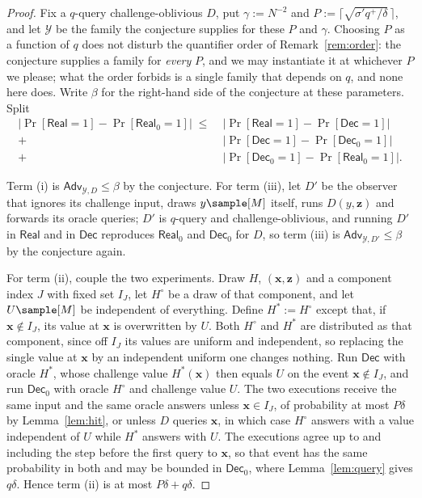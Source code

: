 \documentclass{conjura-conjecture}
\newcommand{\Adv}{\mathsf{Adv}}
\newcommand{\Real}{\mathsf{Real}}
\newcommand{\Dec}{\mathsf{Dec}}
\newcommand{\Prob}[1]{\Pr\!\left[#1\right]}
\newcommand{\vx}{\mathbf{x}}
\newcommand{\vz}{\mathbf{z}}
\begin{document}
\begin{proof}
Fix a $q$-query challenge-oblivious $D$, put $\gamma := N^{-2}$ and
$P := \lceil \sqrt{\sigma' q^{+}/\delta}\, \rceil$, and let $\mathcal{Y}$ be
the family the conjecture supplies for these $P$ and $\gamma$. Choosing $P$
as a function of $q$ does not disturb the quantifier order of
Remark~\ref{rem:order}: the conjecture supplies a family for \emph{every}
$P$, and we may instantiate it at whichever $P$ we please; what the order
forbids is a single family that depends on $q$, and none here does. Write
$\beta$ for the right-hand side of the conjecture at these parameters.
Split
\begin{align*}
  \bigl|\Prob{\Real = 1} - \Prob{\Real_0 = 1}\bigr|
  \;\le\;&
  \bigl|\Prob{\Real = 1} - \Prob{\Dec = 1}\bigr| \tag{i}\\
  +\;& \bigl|\Prob{\Dec = 1} - \Prob{\Dec_0 = 1}\bigr| \tag{ii}\\
  +\;& \bigl|\Prob{\Dec_0 = 1} - \Prob{\Real_0 = 1}\bigr| . \tag{iii}
\end{align*}

Term (i) is $\Adv_{\mathcal{Y},D} \le \beta$ by the conjecture. For term
(iii), let $D'$ be the observer that ignores its challenge input, draws
$y \sample [M]$ itself, runs $D(y,\vz)$ and forwards its oracle queries;
$D'$ is $q$-query and challenge-oblivious, and running $D'$ in $\Real$ and
in $\Dec$ reproduces $\Real_0$ and $\Dec_0$ for $D$, so term (iii) is
$\Adv_{\mathcal{Y},D'} \le \beta$ by the conjecture again.

For term (ii), couple the two experiments. Draw $H$, $(\vx,\vz)$ and a
component index $J$ with fixed set $I_J$, let $H^{\circ}$ be a draw of that
component, and let $U \sample [M]$ be independent of everything. Define
$H^{*} := H^{\circ}$ except that, if $\vx \notin I_J$, its value at $\vx$ is
overwritten by $U$. Both $H^{\circ}$ and $H^{*}$ are distributed as that
component, since off $I_J$ its values are uniform and independent, so
replacing the single value at $\vx$ by an independent uniform one changes
nothing. Run $\Dec$ with oracle $H^{*}$, whose challenge value
$H^{*}(\vx)$ then equals $U$ on the event $\vx \notin I_J$, and run
$\Dec_0$ with oracle $H^{\circ}$ and challenge value $U$. The two
executions receive the same input and the same oracle answers unless
$\vx \in I_J$, of probability at most $P\delta$ by
Lemma~\ref{lem:hit}, or unless $D$ queries $\vx$, in which case
$H^{\circ}$ answers with a value independent of $U$ while $H^{*}$ answers
with $U$. The executions agree up to and including the step before the
first query to $\vx$, so that event has the same probability in both and
may be bounded in $\Dec_0$, where Lemma~\ref{lem:query} gives $q\delta$.
Hence term (ii) is at most $P\delta + q\delta$.


\end{proof}
\end{document}
